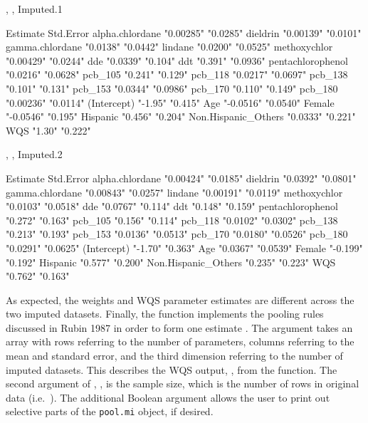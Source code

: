 \begin{Schunk}
\begin{Soutput}
, , Imputed.1

                    Estimate  Std.Error
alpha.chlordane     "0.00285" "0.0285" 
dieldrin            "0.00139" "0.0101" 
gamma.chlordane     "0.0138"  "0.0442" 
lindane             "0.0200"  "0.0525" 
methoxychlor        "0.00429" "0.0244" 
dde                 "0.0339"  "0.104"  
ddt                 "0.391"   "0.0936" 
pentachlorophenol   "0.0216"  "0.0628" 
pcb_105             "0.241"   "0.129"  
pcb_118             "0.0217"  "0.0697" 
pcb_138             "0.101"   "0.131"  
pcb_153             "0.0344"  "0.0986" 
pcb_170             "0.110"   "0.149"  
pcb_180             "0.00236" "0.0114" 
(Intercept)         "-1.95"   "0.415"  
Age                 "-0.0516" "0.0540" 
Female              "-0.0546" "0.195"  
Hispanic            "0.456"   "0.204"  
Non.Hispanic_Others "0.0333"  "0.221"  
WQS                 "1.30"    "0.222"  

, , Imputed.2

                    Estimate  Std.Error
alpha.chlordane     "0.00424" "0.0185" 
dieldrin            "0.0392"  "0.0801" 
gamma.chlordane     "0.00843" "0.0257" 
lindane             "0.00191" "0.0119" 
methoxychlor        "0.0103"  "0.0518" 
dde                 "0.0767"  "0.114"  
ddt                 "0.148"   "0.159"  
pentachlorophenol   "0.272"   "0.163"  
pcb_105             "0.156"   "0.114"  
pcb_118             "0.0102"  "0.0302" 
pcb_138             "0.213"   "0.193"  
pcb_153             "0.0136"  "0.0513" 
pcb_170             "0.0180"  "0.0526" 
pcb_180             "0.0291"  "0.0625" 
(Intercept)         "-1.70"   "0.363"  
Age                 "0.0367"  "0.0539" 
Female              "-0.199"  "0.192"  
Hispanic            "0.577"   "0.200"  
Non.Hispanic_Others "0.235"   "0.223"  
WQS                 "0.762"   "0.163"  
\end{Soutput}
\end{Schunk}

As expected, the weights and WQS parameter estimates are different
across the two imputed datasets. Finally, the  function
implements the pooling rules discussed in Rubin 1987
\citep{rubinMultipleImputationNonresponse1987} in order to form one
estimate
\citep{dongPrincipledMissingData2013, rubinMultipleImputationNonresponse1987, whiteMultipleImputationUsing2011}.
The  argument takes an array with rows referring to the
number of parameters, columns referring to the mean and standard error,
and the third dimension referring to the number of imputed datasets.
This describes the WQS output, ,
from the  function. The second argument of
, , is the sample size, which is the number of
rows in original data (i.e.~). The
additional Boolean argument  allows the user to print out
selective parts of the \texttt{pool.mi} object, if desired.


